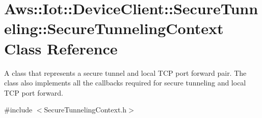 \hypertarget{class_aws_1_1_iot_1_1_device_client_1_1_secure_tunneling_1_1_secure_tunneling_context}{}\section{Aws\+:\+:Iot\+:\+:Device\+Client\+:\+:Secure\+Tunneling\+:\+:Secure\+Tunneling\+Context Class Reference}
\label{class_aws_1_1_iot_1_1_device_client_1_1_secure_tunneling_1_1_secure_tunneling_context}


A class that represents a secure tunnel and local T\+CP port forward pair. The class also implements all the callbacks required for secure tunneling and local T\+CP port forward.  




{\ttfamily \#include $<$Secure\+Tunneling\+Context.\+h$>$}

